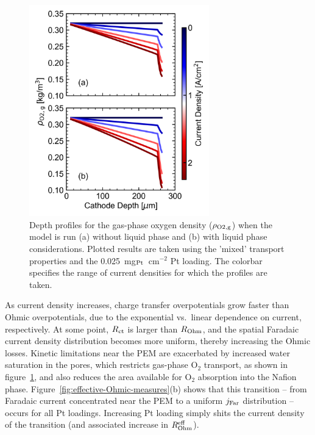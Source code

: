\documentclass[final,3p,times,twocolumn]{elsarticle}    %
\begin{document}
\begin{figure}[!tb]
    \centering
    \includegraphics[width=3.07in]{figures/o2-grads-3_07in.png}
    \caption{Depth profiles for the gas-phase oxygen density ($\rho_{\rm O2, g}$) when the model is run (a) without liquid phase and (b) with liquid phase considerations. Plotted results are taken using the 'mixed' transport properties and the 0.025~mg$_{\rm Pt}$~cm$^{-2}$ Pt loading. The colorbar specifies the range of current densities for which the profiles are taken.}
    \label{fig:o2-grads-with-flooding}
\end{figure}

As current density increases, charge transfer overpotentials grow faster than Ohmic overpotentials, due to the exponential vs.~linear dependence on current, respectively. At some point, $R_{\rm ct}$ is larger than $R_{\rm Ohm}$, and the spatial Faradaic current density distribution becomes more uniform, thereby increasing the Ohmic losses. Kinetic limitations near the PEM are exacerbated by increased water saturation in the pores, which restricts gas-phase O$_2$ transport, as shown in figure~\ref{fig:o2-grads-with-flooding}, and also reduces the area available for O$_2$ absorption into the Nafion phase. Figure~\ref{fig:effective-Ohmic-measures}(b) shows that this transition -- from Faradaic current concentrated near the PEM to a uniform $j_{\rm Far}$ distribution -- occurs for all Pt loadings. Increasing Pt loading simply shits the current density of the transition (and associated increase in $R_{\rm Ohm}^{\rm eff}$). 
\end{document}
